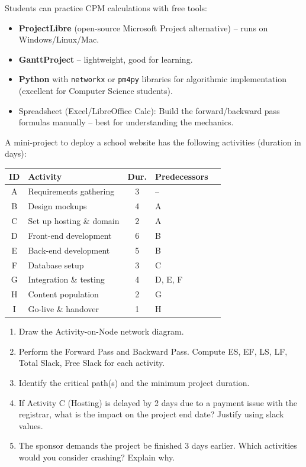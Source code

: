 \documentclass[11pt]{article}
\begin{document}
\begin{savaistu}
Students can practice CPM calculations with free tools:
\begin{itemize}
    \item \textbf{ProjectLibre} (open-source Microsoft Project alternative) -- runs on Windows/Linux/Mac.
    \item \textbf{GanttProject} -- lightweight, good for learning.
    \item \textbf{Python} with \texttt{networkx} or \texttt{pm4py} libraries for algorithmic implementation (excellent for Computer Science students).
    \item Spreadsheet (Excel/LibreOffice Calc): Build the forward/backward pass formulas manually -- best for understanding the mechanics.
\end{itemize}
\end{savaistu}

\begin{exercice}
A mini-project to deploy a school website has the following activities (duration in days):

\begin{center}
\begin{tabular}{|c|l|c|lc|}\hline
\textbf{ID} & \textbf{Activity} & \textbf{Dur.} & \textbf{Predecessors} \\ \hline
A & Requirements gathering & 3 & -- \\
B & Design mockups & 4 & A \\
C & Set up hosting \& domain & 2 & A \\
D & Front-end development & 6 & B \\
E & Back-end development & 5 & B \\
F & Database setup & 3 & C \\
G & Integration \& testing & 4 & D, E, F \\
H & Content population & 2 & G \\
I & Go-live \& handover & 1 & H \\ \hline
\end{tabular}
\end{center}

\begin{enumerate}
    \item Draw the Activity-on-Node network diagram.
    \item Perform the Forward Pass and Backward Pass. Compute ES, EF, LS, LF, Total Slack, Free Slack for each activity.
    \item Identify the critical path(s) and the minimum project duration.
    \item If Activity C (Hosting) is delayed by 2 days due to a payment issue with the registrar, what is the impact on the project end date? Justify using slack values.
    \item The sponsor demands the project be finished 3 days earlier. Which activities would you consider crashing? Explain why.
\end{enumerate}
\end{exercice}
\end{document}
